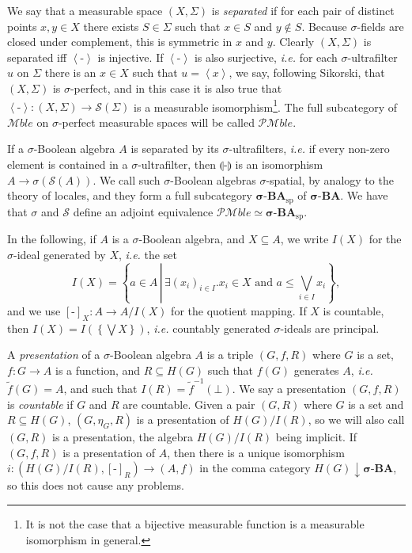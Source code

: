 \documentclass{lmcs}
\newcommand{\blank}{\ensuremath{{\mbox{-}}}}
\newcommand{\Mble}{\ensuremath{\mathcal{M}ble}}
\newcommand{\cat}[1]{\ensuremath{\mathbf{#1}}}
\newcommand{\PMble}{\ensuremath{\mathcal{PM}ble}} %
\newcommand{\sigmaBA}{\cat{\sigma\text{-}BA}}
\newcommand{\princip}[1]{\left\langle #1 \right\rangle}
\newcommand{\ban}[1]{\llparenthesis #1 \rrparenthesis}
\newcommand{\Sik}{\mathcal{S}}
\newcommand{\sigmaBASp}{\sigmaBA_{\mathrm{sp}}}
\begin{document}
 We say that a measurable space $(X,\Sigma)$ is \emph{separated} if for each pair of distinct points $x,y \in X$ there exists $S \in \Sigma$ such that $x \in S$ and $y \not\in S$. Because $\sigma$-fields are closed under complement, this is symmetric in $x$ and $y$. Clearly $(X,\Sigma)$ is separated iff $\princip{\blank}$ is injective. If $\princip{\blank}$ is also surjective, \emph{i.e.} for each $\sigma$-ultrafilter $u$ on $\Sigma$ there is an $x \in X$ such that $u = \princip{x}$, we say, following Sikorski, that $(X,\Sigma)$ is $\sigma$-perfect, and in this case it is also true that $\princip{\blank} : (X,\Sigma) \rightarrow \Sik(\Sigma)$ is a measurable isomorphism\footnote{It is not the case that a bijective measurable function is a measurable isomorphism in general.}. The full subcategory of $\Mble$ on $\sigma$-perfect measurable spaces will be called $\PMble$.

If a $\sigma$-Boolean algebra $A$ is separated by its $\sigma$-ultrafilters, \emph{i.e.} if every non-zero element is contained in a $\sigma$-ultrafilter, then $\ban{\blank}$ is an isomorphism $A \rightarrow \sigma(\Sik(A))$. We call such $\sigma$-Boolean algebras $\sigma$-spatial, by analogy to the theory of locales, and they form a full subcategory $\sigmaBASp$ of $\sigmaBA$. We have that $\sigma$ and $\Sik$ define an adjoint equivalence $\PMble \simeq \sigmaBASp$. 

In the following, if $A$ is a $\sigma$-Boolean algebra, and $X \subseteq A$, we write $I(X)$ for the $\sigma$-ideal generated by $X$, \emph{i.e.} the set 
\[
I(X) = \left\{a \in A \,\left|\, \exists (x_i)_{i \in I} . x_i \in X \text{ and } a \leq \bigvee_{i \in I}x_i \right. \right\},
\]
and we use $[\blank]_X : A \rightarrow A/I(X)$ for the quotient mapping. If $X$ is countable, then $I(X) = I\left(\left\{\bigvee X\right\}\right)$, \emph{i.e.} countably generated $\sigma$-ideals are principal.

A \emph{presentation} of a $\sigma$-Boolean algebra $A$ is a triple $(G,f,R)$ where $G$ is a set, $f: G \rightarrow A$ is a function, and $R \subseteq H(G)$ such that $f(G)$ generates $A$, \emph{i.e.} $\tilde{f}(G) = A$, and such that $I(R) = \tilde{f}^{-1}(\bot)$. We say a presentation $(G,f,R)$ is \emph{countable} if $G$ and $R$ are countable. Given a pair $(G,R)$ where $G$ is a set and $R \subseteq H(G)$, $(G,\eta_G,R)$ is a presentation of $H(G)/I(R)$, so we will also call $(G,R)$ is a presentation, the algebra $H(G)/I(R)$ being implicit. If $(G,f,R)$ is a presentation of $A$, then there is a unique isomorphism $i : (H(G)/I(R), [\blank]_R) \rightarrow (A,f)$ in the comma category $H(G)\downarrow \sigmaBA$, so this does not cause any problems.
\end{document}
